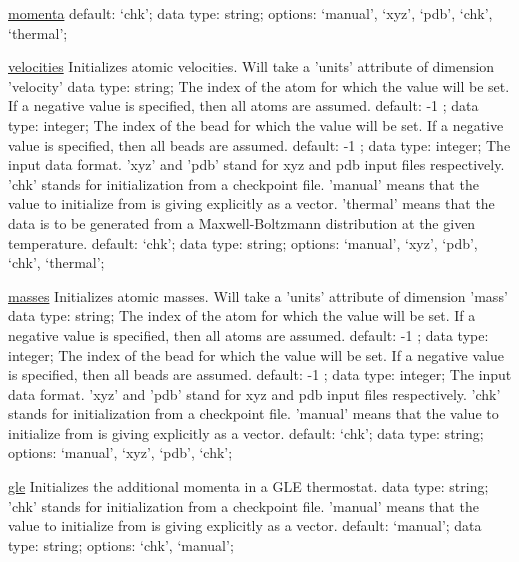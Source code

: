 \begin{ipifield}{}
\begin{ipifield}{\hyperref[INITMOMENTA]{momenta}}
{{default: `chk'; data type: string; options: `manual', `xyz', `pdb', `chk', `thermal'; }%
}
\end{ipifield}
\begin{ipifield}{\hyperref[INITVELOCITIES]{velocities}}%
{Initializes atomic velocities. Will take a 'units' attribute of dimension 'velocity'}%
{data type: string; }%
{%
{The index of the atom for which the value will be set. If a negative value is specified, then all atoms are assumed.}%
{default:  -1 ; data type: integer; }%
%
{The index of the bead for which the value will be set. If a negative value is specified, then all beads are assumed.}%
{default:  -1 ; data type: integer; }%
%
{The input data format. 'xyz' and 'pdb' stand for xyz and pdb input files respectively. 'chk' stands for initialization from a checkpoint file. 'manual' means that the value to initialize from is giving explicitly as a vector. 'thermal' means that the data is to be generated from a Maxwell-Boltzmann distribution at the given temperature.}%
{default: `chk'; data type: string; options: `manual', `xyz', `pdb', `chk', `thermal'; }%
}
\end{ipifield}
\begin{ipifield}{\hyperref[INITMASSES]{masses}}%
{Initializes atomic masses. Will take a 'units' attribute of dimension 'mass'}%
{data type: string; }%
{%
{The index of the atom for which the value will be set. If a negative value is specified, then all atoms are assumed.}%
{default:  -1 ; data type: integer; }%
%
{The index of the bead for which the value will be set. If a negative value is specified, then all beads are assumed.}%
{default:  -1 ; data type: integer; }%
%
{The input data format. 'xyz' and 'pdb' stand for xyz and pdb input files respectively. 'chk' stands for initialization from a checkpoint file. 'manual' means that the value to initialize from is giving explicitly as a vector.}%
{default: `chk'; data type: string; options: `manual', `xyz', `pdb', `chk'; }%
}
\end{ipifield}
\begin{ipifield}{\hyperref[INITTHERMO]{gle}}%
{Initializes the additional momenta in a GLE thermostat.}%
{data type: string; }%
{%
{'chk' stands for initialization from a checkpoint file. 'manual' means that the value to initialize from is giving explicitly as a vector.}%
{default: `manual'; data type: string; options: `chk', `manual'; }%
}
\end{ipifield}
\end{ipifield}
